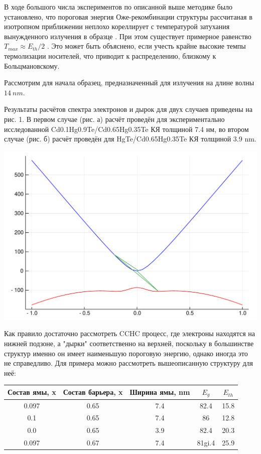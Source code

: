 \documentclass[../main.tex]{subfiles}
\begin{document}
    В ходе большого числа экспериментов по описанной выше методике было установлено, что пороговая энергия 
    Оже-рекомбинации структуры рассчитаная в изотропном приближении неплохо кореллирует с температурой затухания 
    вынужденного излучения в образце . При этом существует примерное равенство $T_{max} \approx E_{th} / 2$ 
    \cite{TmaxEthEq}. Это может быть объяснено, если учесть крайне высокие темпы термолизации носителей, что приводит
    к распределению, близкому к Больцмановскому.

    Рассмотрим для начала образец, предназначенный для излучения на длине волны $14~nm$.

    Результаты расчётов спектра электронов и дырок для двух случаев приведены на рис. 1. В первом случае (рис.  а) расчёт
    проведён для экспериментально исследованной Cd0.1Hg0.9Te/Cd0.65Hg0.35Te КЯ толщиной 7.4 нм, во втором случае (рис.  б)
    расчёт проведён для HgTe/Cd0.65Hg0.35Te КЯ толщиной 3.9 nm.

    \begin{center}
        \includegraphics[width=0.7\linewidth]{./images/14um/r14mkm.pdf}
    \end{center}

    Как правило достаточно рассмотреть CCHC процесс, где электроны находятся на нижней подзоне, а "дырки" соответственно на верхней,
    поскольку в большинстве структур именно он имеет наименьшую пороговую энергию, однако иногда это не справедливо. Для примера 
    можно рассмотреть вышеописанную структуру для неё:

    \begin{center}
        \begin{tabular}{c | c | c | c | c}
            Состав ямы, x & Состав барьера, x & Ширина ямы, nm& $E_g$    & $E_{th}$\\
            \hline
            0.097 & 0.65    &  7.4 & 82.4    & 15.8\\
            \hline
            0.1 & 0.65      & 7.4  & 86 & 12.8\\
            0.0 & 0.65      & 3.9   & 82.4  & 20.3\\
            0.097   & 0.67  & 7.4  & 81gi.4  & 25.9\\
        \end{tabular}
    \end{center}
\end{document}
